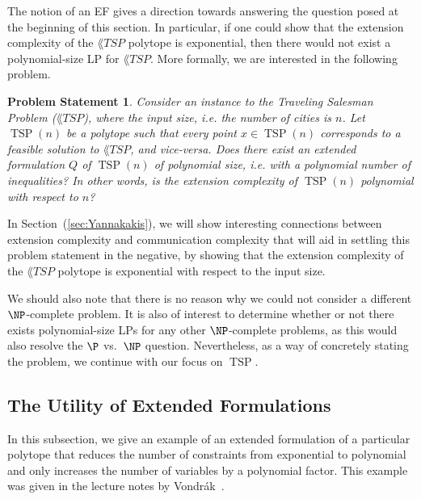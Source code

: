 \documentclass{article}
\newtheorem{probstate}[theorem]{\sc Problem Statement}
\theoremstyle{definition}
\theoremstyle{remark}
\newcommand{\TSP}{\operatorname{TSP}}
\begin{document}
The notion of an EF gives a direction towards answering the question posed at the beginning of this section. In particular, if one could show that the extension complexity of the $\lang{TSP}$ polytope is exponential, then there would not exist a polynomial-size LP for $\lang{TSP}$. More formally, we are interested in the following problem.

\begin{probstate}
Consider an instance to the Traveling Salesman Problem ($\lang{TSP}$), where the input size, i.e. the number of cities is $n$. Let $\TSP(n)$ be a polytope such that every point $x \in \TSP(n)$ corresponds to a feasible solution to $\lang{TSP}$, and vice-versa. Does there exist an extended formulation $Q$ of $\TSP(n)$ of polynomial size, i.e. with a polynomial number of inequalities? In other words, is the extension complexity of $\TSP(n)$ polynomial with respect to $n$?
\end{probstate}

In Section~(\ref{sec:Yannakakis}), we will show interesting connections between extension complexity and communication complexity that will aid in settling this problem statement in the negative, by showing that the extension complexity of the $\lang{TSP}$ polytope is exponential with respect to the input size.

We should also note that there is no reason why we could not consider a different $\NP$-complete problem. It is also of interest to determine whether or not there exists polynomial-size LPs for any other $\NP$-complete problems, as this would also resolve the $\P$ vs.\ $\NP$ question. Nevertheless, as a way of concretely stating the problem, we continue with our focus on $\TSP$.

\subsection{The Utility of Extended Formulations}\label{sec:utility-EF}

In this subsection, we give an example of an extended formulation of a particular polytope that reduces the number of constraints from exponential to polynomial and only increases the number of variables by a polynomial factor. This example was given in the lecture notes by Vondr\'ak~\cite{vondrak-class}.
\end{document}
